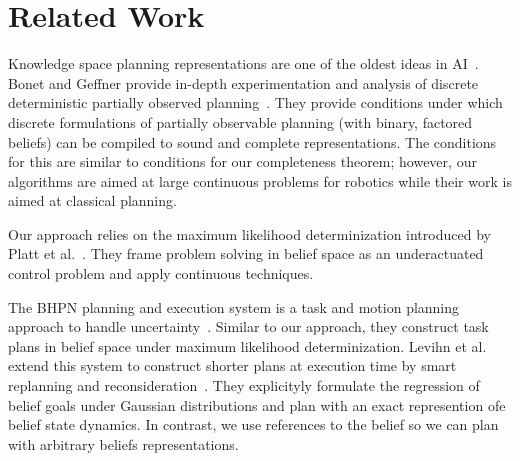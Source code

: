\section{Related Work}

Knowledge space planning representations are one of the oldest ideas
in AI~\cite{mccarthy1968some}. Bonet and Geffner provide in-depth
experimentation and analysis of discrete deterministic partially
observed planning~\cite{bonet2011planning}.  They provide conditions
under which discrete formulations of partially observable planning
(with binary, factored beliefs) can be compiled to sound and complete
representations. The conditions for this are similar to conditions for
our completeness theorem; however, our algorithms are aimed at large
continuous problems for robotics while their work is aimed at
classical planning.

Our approach relies on the maximum likelihood determinization
introduced by Platt et al.~\cite{platt2010belief}. They frame problem
solving in belief space as an underactuated control problem and apply
continuous techniques. 

The BHPN planning and execution system is a task and motion planning
approach to handle uncertainty~\cite{kaelbling2013integrated}. Similar
to our approach, they construct task plans in belief space under
maximum likelihood determinization. Levihn et al. extend this system
to construct shorter plans at execution time by smart replanning and
reconsideration~\cite{levihn2013foresight}. They explicityly formulate
the regression of belief goals under Gaussian distributions and plan
with an exact represention ofe belief state dynamics. In contrast, we
use references to the belief so we can plan with arbitrary beliefs
representations.

